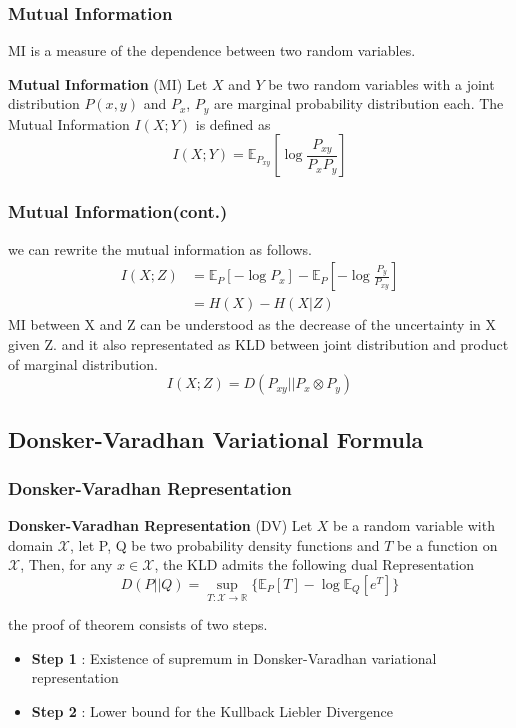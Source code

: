 \documentclass[aspectratio=169]{beamer}
\begin{document}
\begin{frame}
	\frametitle{Mutual Information} 
	MI is a measure of the dependence between two random variables.
	\begin{definition} \label{def:mutual_information}
		\textbf{Mutual Information} (MI) Let $X$ and $Y$ be two random variables with a joint
		distribution $P(x, y)$ and $P_x$, $P_y$ are marginal probability distribution each.
		The Mutual Information $I(X;Y)$ is defined as
		\begin{equation*}I(X;Y) = \mathbb{E}_{P_{xy}} [\log\frac{P_{xy}}{P_x P_y}]\end{equation*}
	\end{definition}	
\end{frame}

\begin{frame}
	\frametitle{Mutual Information(cont.)}
	we can rewrite the mutual information as follows.
	\begin{align*}
		I(X;Z)&= \mathbb{E}_P[-\log P_x] - \mathbb{E}_P[-\log\frac{P_y}{P_{xy}}]\\
		&= H(X)-H(X|Z)
	\end{align*}
	MI between X and Z can be understood as the decrease of the uncertainty in X given Z.
	and it also representated as KLD between joint distribution and product of marginal distribution.
	\begin{equation}\label{eq:kl_form} I(X;Z) = D(P_{xy}||P_{x} \otimes P_{y}) \end{equation}
\end{frame}

\subsection{Donsker-Varadhan Variational Formula}
	\begin{frame}
		\frametitle{Donsker-Varadhan Representation}
		\begin{theorem}
			\textbf{Donsker-Varadhan Representation} (DV)
			Let $X$ be a random variable with domain $\mathcal{X}$, let P, Q be two probability density functions
			and $T$ be a function on $\mathcal{X}$, 
			Then, for any $x \in \mathcal{X}$, the KLD admits the following dual Representation
			\begin{equation*}
				D(P || Q) = \sup_{T:\mathcal{X} \rightarrow \mathbb{R}} \{ \mathbb{E}_P[T] - \log \mathbb{E}_Q[e^{T}]\}
			\end{equation*}
		\end{theorem}
		the proof of theorem consists of two steps.
		\begin{itemize}
			\item \textbf{Step 1} : Existence of supremum in Donsker-Varadhan variational representation
			\item \textbf{Step 2} : Lower bound for the Kullback Liebler Divergence
		\end{itemize}	
	\end{frame}
\end{document}
